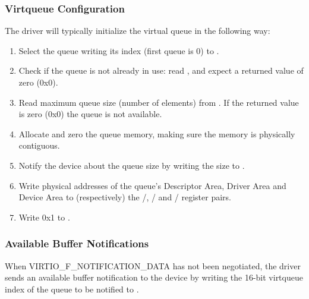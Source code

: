 \subsubsection{Virtqueue Configuration}\label{sec:Virtio Transport Options / Virtio Over MMIO / MMIO-specific Initialization And Device Operation / Virtqueue Configuration}

The driver will typically initialize the virtual queue in the following way:

\begin{enumerate}
\item Select the queue writing its index (first queue is 0) to
   .

\item Check if the queue is not already in use: read ,
   and expect a returned value of zero (0x0).

\item Read maximum queue size (number of elements) from
   . If the returned value is zero (0x0) the
   queue is not available.

\item Allocate and zero the queue memory, making sure the memory
   is physically contiguous.

\item Notify the device about the queue size by writing the size to
   .

\item Write physical addresses of the queue's Descriptor Area,
   Driver Area and Device Area to (respectively) the
   /,
   / and
   / register pairs.

\item Write 0x1 to .
\end{enumerate}

\subsubsection{Available Buffer Notifications}\label{sec:Virtio Transport Options / Virtio Over MMIO / MMIO-specific Initialization And Device Operation / Available Buffer Notifications}

When VIRTIO_F_NOTIFICATION_DATA has not been negotiated,
the driver sends an available buffer notification to the device by writing
the 16-bit virtqueue index
of the queue to be notified to .

